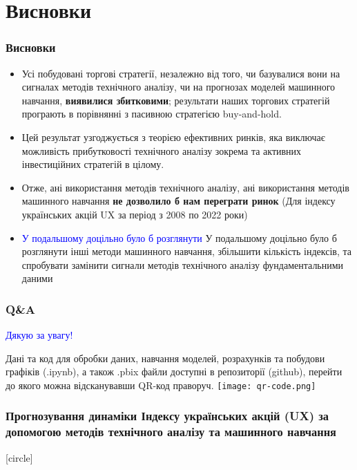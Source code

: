 \documentclass[aspectratio=169]{beamer}
\begin{document}
\section{Висновки}

\begin{frame}
\frametitle{Висновки}
\begin{itemize}
\item Усі побудовані торгові стратегії, незалежно від того, чи базувалися вони на 
сигналах  методів  технічного  аналізу,  чи  на  прогнозах  моделей  машинного навчання, \alert {\textbf{виявилися збитковими}}; результати наших торгових стратегій програють в порівнянні з пасивною  стратегією  buy-and-hold.  
\bigskip
\item Цей  результат  узгоджується  з  теорією ефективних ринків, яка виключає можливість прибутковості технічного аналізу зокрема та активних інвестиційних стратегій в цілому.
\bigskip
\item Отже, ані використання методів технічного аналізу, ані використання методів машинного навчання \alert {\textbf{не дозволило б нам переграти ринок}} (Для індексу українських акцій UX за період з 2008 по 2022 роки)
\bigskip
{}
\item \textcolor{blue} {У подальшому доцільно було б розглянути} У  подальшому  доцільно  було  б  розглянути  інші  методи  машинного навчання, збільшити кількість індексів, та спробувати замінити сигнали  методів технічного  аналізу  фундаментальними даними
\bigskip
\end{itemize}
\end{frame}

\begin{frame}
\frametitle{Q\&A}
\begin{center}
\bigskip
\textcolor{blue}{\huge Дякую за увагу!} \\
\end{center}
\begin{multicols}{2}

\vbox{\vspace{0.8cm}}
Дані та код для обробки даних, навчання моделей, розрахунків та побудови графіків (.ipynb), а також .pbix файли доступні в репозиторії (github), перейти до якого можна відсканувавши QR-код праворуч.
\columnbreak
\hspace{5mm}
\texttt{[image: qr-code.png]}
\end{multicols}
\end{frame}

\begin{frame}
\frametitle {Прогнозування динаміки Індексу українських акцій (UX) за допомогою методів технічного аналізу та машинного навчання}
[circle]
\tableofcontents
\end{frame}
\end{document}
